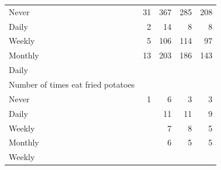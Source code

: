 \documentclass{article}
\begin{document}
\begin{table}[!h]
{\begin{tabular}{lllll}
			\multicolumn{1}{l}{\hspace{5em}Never} &
			\multicolumn{1}{|r}{31} &
			\multicolumn{1}{r}{367} &
			\multicolumn{1}{r}{285} &
			\multicolumn{1}{r}{208} \\
			\multicolumn{1}{l}{\hspace{5em}Daily} &
			\multicolumn{1}{|r}{2} &
			\multicolumn{1}{r}{14} &
			\multicolumn{1}{r}{8} &
			\multicolumn{1}{r}{8} \\
			\multicolumn{1}{l}{\hspace{5em}Weekly} &
			\multicolumn{1}{|r}{5} &
			\multicolumn{1}{r}{106} &
			\multicolumn{1}{r}{114} &
			\multicolumn{1}{r}{97} \\
			\multicolumn{1}{l}{\hspace{5em}Monthly} &
			\multicolumn{1}{|r}{13} &
			\multicolumn{1}{r}{203} &
			\multicolumn{1}{r}{186} &
			\multicolumn{1}{r}{143} \\
			\multicolumn{1}{l}{\hspace{3em}Daily} &
			\multicolumn{1}{|r}{} &
			\multicolumn{1}{r}{} &
			\multicolumn{1}{r}{} &
			\multicolumn{1}{r}{} \\
			\multicolumn{1}{l}{\hspace{4em}Number of times eat fried potatoes} &
			\multicolumn{1}{|r}{} &
			\multicolumn{1}{r}{} &
			\multicolumn{1}{r}{} &
			\multicolumn{1}{r}{} \\
			\multicolumn{1}{l}{\hspace{5em}Never} &
			\multicolumn{1}{|r}{1} &
			\multicolumn{1}{r}{6} &
			\multicolumn{1}{r}{3} &
			\multicolumn{1}{r}{3} \\
			\multicolumn{1}{l}{\hspace{5em}Daily} &
			\multicolumn{1}{|r}{} &
			\multicolumn{1}{r}{11} &
			\multicolumn{1}{r}{11} &
			\multicolumn{1}{r}{9} \\
			\multicolumn{1}{l}{\hspace{5em}Weekly} &
			\multicolumn{1}{|r}{} &
			\multicolumn{1}{r}{7} &
			\multicolumn{1}{r}{8} &
			\multicolumn{1}{r}{5} \\
			\multicolumn{1}{l}{\hspace{5em}Monthly} &
			\multicolumn{1}{|r}{} &
			\multicolumn{1}{r}{6} &
			\multicolumn{1}{r}{5} &
			\multicolumn{1}{r}{5} \\
			\multicolumn{1}{l}{\hspace{3em}Weekly} &
			\multicolumn{1}{|r}{} &
			\multicolumn{1}{r}{} &
			\multicolumn{1}{r}{} &
			\multicolumn{1}{r}{} \\

\end{tabular}}
\end{table}
\end{document}
